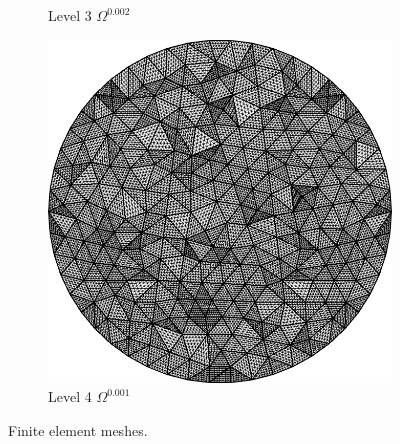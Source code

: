 \begin{figure}[t]
\begin{subfigure}[t]{.23\linewidth}
   \caption{Level 3 $\Omega^{0.002}$}
 \end{subfigure}\hfill
  \begin{subfigure}[t]{.23\linewidth}
  \includegraphics[width=1\textwidth]{./Images/M4.png}
   \caption{Level 4 $\Omega^{0.001}$}
 \end{subfigure}
 \caption{Finite element meshes.}\label{fig:4meshes}
 \end{figure}
	

